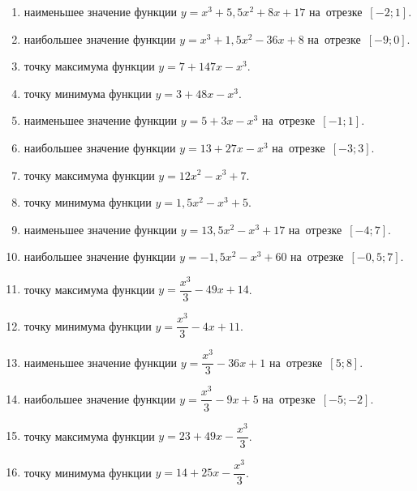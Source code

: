 \documentclass[a4paper,10pt]{article}
\begin{document}
\begin{enumerate}
\item {} наименьшее значение функции $y=x^3 +5,5x^2+8x+17$ на~отрезке~$\left[-2;1\right]$.

\item {} наибольшее значение функции $y=x^3 +1,5x^2-36x+8$ на~отрезке~$\left[-9;0\right]$.

\item {} точку максимума функции $y=7+147x-x^3$.

\item {} точку минимума функции $y=3+48x-x^3$.

\item {} наименьшее значение функции $y=5+3x-x^3$ на~отрезке~$\left[-1;1\right]$.

\item {} наибольшее значение функции $y=13+27x-x^3$ на~отрезке~$\left[-3;3\right]$.

\item {} точку максимума функции $y=12x^2-x^3+7$.

\item {} точку минимума функции $y=1,5x^2-x^3+5$.

\item {} наименьшее значение функции $y=13,5x^2-x^3+17$ на~отрезке~$\left[-4;7\right]$.

\item {} наибольшее значение функции $y=-1,5x^2-x^3+60$ на~отрезке~$\left[-0,5;7\right]$.

\item {} точку максимума функции $y=\dfrac{x^3}{3} -49x+14$.

\item {} точку минимума функции $y=\dfrac{x^3}{3} -4x+11$.

\item {} наименьшее значение функции $y=\dfrac{x^3}{3} -36x+1$ на~отрезке~$\left[5;8\right]$.

\item {} наибольшее значение функции $y=\dfrac{x^3}{3} -9x+5$ на~отрезке~$\left[-5;-2\right]$.

\item {} точку максимума функции $y=23 +49x-\dfrac{x^3}{3}$.

\item {} точку минимума функции $y=14 +25x-\dfrac{x^3}{3}$.


\end{enumerate}
\end{document}
